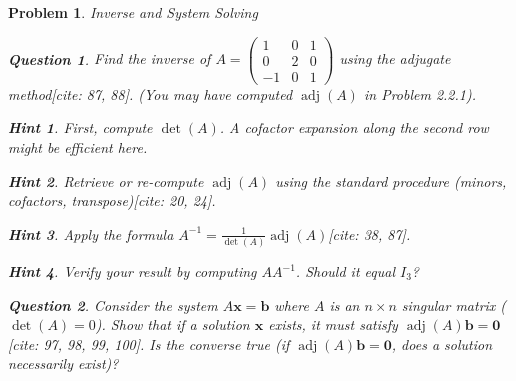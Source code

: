 \documentclass[12pt]{article}
\newtheorem{problem}{Problem}[section]
\newtheorem{question}{Question}[problem]
\theoremstyle{definition}
\newtheorem{hint}{Hint}[question]
\newcommand{\adj}{\operatorname{adj}}
\newcommand{\detm}{\operatorname{det}}
\begin{document}
\begin{problem}{Inverse and System Solving}
    \begin{question}
        Find the inverse of $A = \begin{pmatrix} 1 & 0 & 1 \\ 0 & 2 & 0 \\ -1 & 0 & 1 \end{pmatrix}$ using the adjugate method[cite: 87, 88]. (You may have computed $\adj(A)$ in Problem 2.2.1).
    \end{question}
    
        \begin{hint}
            First, compute $\detm(A)$. A cofactor expansion along the second row might be efficient here.
        \end{hint}
        \begin{hint}
            Retrieve or re-compute $\adj(A)$ using the standard procedure (minors, cofactors, transpose)[cite: 20, 24].
        \end{hint}
        \begin{hint}
            Apply the formula $A^{-1} = \frac{1}{\detm(A)} \adj(A)$[cite: 38, 87].
        \end{hint}
        \begin{hint}
            Verify your result by computing $A A^{-1}$. Should it equal $I_3$?
        \end{hint}
    

    \begin{question}
        Consider the system $A\mathbf{x} = \mathbf{b}$ where $A$ is an $n \times n$ singular matrix ($\detm(A)=0$). Show that if a solution $\mathbf{x}$ exists, it must satisfy $\adj(A) \mathbf{b} = \mathbf{0}$[cite: 97, 98, 99, 100]. Is the converse true (if $\adj(A) \mathbf{b} = \mathbf{0}$, does a solution necessarily exist)?
    \end{question}
    

\end{problem}
\end{document}

